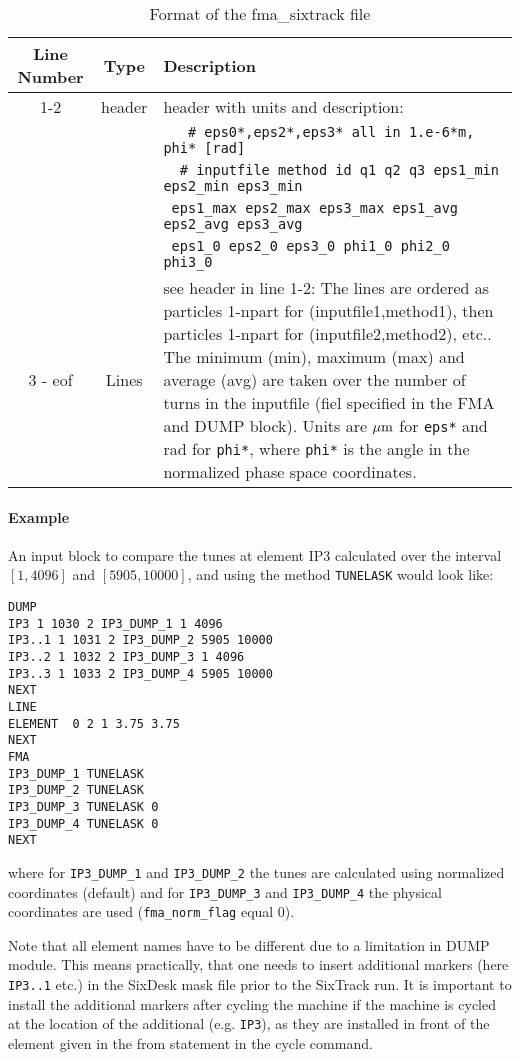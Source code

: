 \documentclass[a4paper,11pt]{report}
\begin{document}
\begin{table}[H]
	\begin{center}
		\caption{Format of the fma\_sixtrack file}\label{fma:tab:3}
		\begin{tabularx}{\textwidth}{|c|c|X|}
			\hline
			{\bf Line Number} & {\bf Type} & {\bf Description} \\
			\hline
			1-2 & header & header with units and description:\\
			& & \verb|   # eps0*,eps2*,eps3* all in 1.e-6*m,     phi* [rad] | \\
			& & \verb|  # inputfile method id q1 q2 q3 eps1_min eps2_min eps3_min | \\
			& & \quad \verb| eps1_max eps2_max eps3_max eps1_avg eps2_avg eps3_avg |\\
			& & \quad \verb| eps1_0 eps2_0 eps3_0 phi1_0 phi2_0 phi3_0| \\\hline
			3 - eof & Lines & see header in line 1-2: The lines are ordered as particles 1-npart for (inputfile1,method1), then  particles 1-npart for (inputfile2,method2), etc.. The minimum (min), maximum (max) and average (avg) are taken over the number of turns in the inputfile (fiel specified in the FMA and DUMP block). Units are $\mu \rm m$ for \verb|eps*| and rad for \verb|phi*|, where \verb|phi*| is the angle in the normalized phase space coordinates.\\\hline
		\end{tabularx}
	\end{center}
\end{table}
\paragraph{Example}
An input block to compare the tunes at element IP3 calculated over the interval $[1,4096]$ and $[5905,10000]$, and using the method \verb|TUNELASK| would look like:
\begin{verbatim}
DUMP
IP3 1 1030 2 IP3_DUMP_1 1 4096
IP3..1 1 1031 2 IP3_DUMP_2 5905 10000
IP3..2 1 1032 2 IP3_DUMP_3 1 4096
IP3..3 1 1033 2 IP3_DUMP_4 5905 10000
NEXT
LINE
ELEMENT  0 2 1 3.75 3.75
NEXT
FMA
IP3_DUMP_1 TUNELASK
IP3_DUMP_2 TUNELASK
IP3_DUMP_3 TUNELASK 0
IP3_DUMP_4 TUNELASK 0
NEXT
\end{verbatim}
where for \verb|IP3_DUMP_1| and \verb|IP3_DUMP_2| the tunes are calculated using normalized coordinates (default) and for \verb|IP3_DUMP_3| and \verb|IP3_DUMP_4| the physical coordinates are used (\verb|fma_norm_flag| equal 0). 

Note that all element names have to be different due to a limitation in DUMP module. This means practically, that one needs to insert additional markers (here \verb|IP3..1| etc.) in the SixDesk \cite{sixdesk1,sixdesk2} mask file prior to the SixTrack run. It is important to install the additional markers after cycling the machine if the machine is cycled at the location of the additional (e.g. \verb|IP3|), as they are installed in front of the element given in the from statement in the cycle command.
\end{document}

